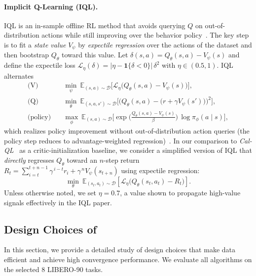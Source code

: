 \paragraph{Implicit Q-Learning (IQL).}
IQL is an in-sample offline RL method that avoids querying $Q$ on out-of-distribution actions while still improving over the behavior policy~\citep{IQL}. The key step is to fit a \emph{state value} $V_\psi$ by \emph{expectile regression} over the actions of the dataset and then bootstrap $Q_\theta$ toward this value. Let $\delta(s,a)=Q_\theta(s,a)-V_\psi(s)$ and define the expectile loss
$\mathcal{L}_\eta(\delta)=\lvert \eta-\mathbf{1}\{\delta<0\}\rvert\,\delta^2$ with $\eta\in(0.5,1)$.
IQL alternates
\begin{align}
\text{(V)}\quad
&\min_{\psi}\ \mathbb{E}_{(s,a)\sim\mathcal{D}}\big[\mathcal{L}_\eta\!\big(Q_\theta(s,a)-V_\psi(s)\big)\big],\\
\text{(Q)}\quad
&\min_{\theta}\ \mathbb{E}_{(s,a,s')\sim\mathcal{D}}\Big[\big(Q_\theta(s,a)-\big(r+\gamma V_\psi(s')\big)\big)^2\Big],\\
\text{(policy)}\quad
&\max_{\phi}\ \mathbb{E}_{(s,a)\sim\mathcal{D}}\!\Big[\exp\!\big(\tfrac{Q_\theta(s,a)-V_\psi(s)}{\beta}\big)\,\log \pi_\phi(a\mid s)\Big],
\end{align}
which realizes policy improvement without out-of-distribution action queries (the policy step reduces to advantage-weighted regression)~\citep{IQL}.
In our comparison to \emph{Cal-QL}~\citep{cal-QL} as a critic-initialization baseline, we consider a simplified version of IQL that \emph{directly} regresses $Q_\theta$ toward an $n$-step return
$R_t=\sum_{i=t}^{t+n-1}\gamma^{\,i-t}r_i+\gamma^{\,n}V_\psi(s_{t+n})$
using expectile regression:
\[
\min_{\theta}\ \mathbb{E}_{(s_t,a_t)\sim\mathcal{D}}\!\left[\mathcal{L}_\eta\!\big(Q_\theta(s_t,a_t)-R_t\big)\right].
\]
Unless otherwise noted, we set $\eta=0.7$, a value shown to propagate high-value signals effectively in the IQL paper. 





\subsection{Design Choices of \method}
\label{sec: RL design}
% 

In this section, we provide a detailed study of design choices that make \method data efficient and achieve high convergence performance. We evaluate all algorithms on the selected 8 LIBERO-90 tasks.


